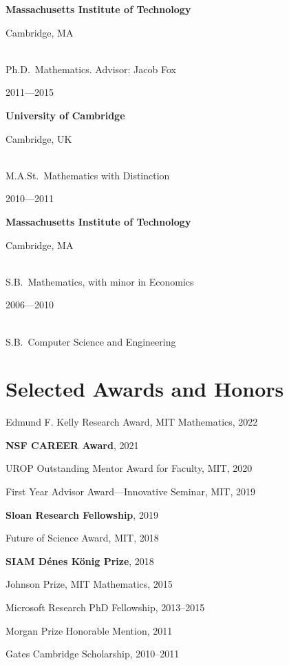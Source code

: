 \documentclass[11pt]{amsart}
\newcommand{\rightloc}[1]{\hfill {\raggedright #1}}
\newcommand{\rightdate}[1]{\hfill {\raggedright #1}}
\newcommand{\p}[1]{{\bfseries #1}}
\newcommand{\q}{\null\quad}
\begin{document}
\p{Massachusetts Institute of Technology} \rightloc{Cambridge, MA}\\
\q Ph.D.~Mathematics. Advisor: Jacob Fox
\rightdate{2011---2015}

\p{University of Cambridge} \rightloc{Cambridge, UK} \\
\q M.A.St.~Mathematics with Distinction \rightdate{2010---2011}

\p{Massachusetts Institute of Technology} \rightloc{Cambridge, MA} \\
\q S.B.~Mathematics, with minor in Economics \rightdate{2006---2010} \\
\q S.B.~Computer Science and Engineering %



\section*{Selected Awards and Honors}

Edmund F. Kelly Research Award, MIT Mathematics, 2022

\textbf{NSF CAREER Award}, 2021

UROP Outstanding Mentor Award for Faculty, MIT, 2020

First Year Advisor Award---Innovative Seminar, MIT, 2019

\textbf{Sloan Research Fellowship}, 2019

Future of Science Award, MIT, 2018

\textbf{SIAM D\'enes K\"onig Prize}, 2018

Johnson Prize, MIT Mathematics, 2015


Microsoft Research PhD Fellowship, 2013--2015




Morgan Prize Honorable Mention, 2011


Gates Cambridge Scholarship, 2010--2011

\end{document}
